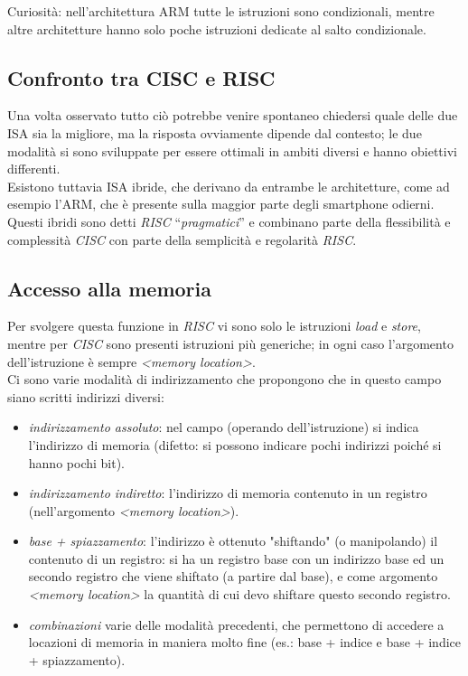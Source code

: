 \documentclass[class=book, crop=false, oneside]{standalone}
\begin{document}
Curiosità: nell'architettura ARM tutte le istruzioni sono condizionali, mentre altre architetture hanno solo poche istruzioni dedicate al salto condizionale.

\subsection{Confronto tra CISC e RISC}
Una volta osservato tutto ciò potrebbe venire spontaneo chiedersi quale delle due ISA sia la migliore, ma la risposta ovviamente dipende dal contesto; le due modalità si sono sviluppate per essere ottimali in ambiti diversi e hanno obiettivi differenti.\\
Esistono tuttavia ISA ibride, che derivano da entrambe le architetture, come ad esempio l’ARM, che è presente sulla maggior parte degli smartphone odierni. Questi ibridi sono detti \emph{RISC} “\emph{pragmatici}” e combinano parte della flessibilità e complessità  \emph{CISC} con parte della semplicità e regolarità \emph{RISC}.

\subsection{Accesso alla memoria}
Per svolgere questa funzione in \emph{RISC} vi sono solo le istruzioni \emph{load} e \emph{store}, mentre per \emph{CISC} sono presenti istruzioni più generiche; in ogni caso l’argomento dell’istruzione è sempre \emph{<memory location>}.\\
Ci sono varie modalità di indirizzamento che propongono che in questo campo siano scritti indirizzi diversi:
\begin{itemize}
	\item \emph{indirizzamento assoluto}: nel campo (operando dell’istruzione) si indica l’indirizzo di memoria (difetto: si possono indicare pochi indirizzi poiché si hanno pochi bit).
	\item \emph{indirizzamento indiretto}: l’indirizzo di memoria contenuto in un registro (nell’argomento \emph{<memory location>}).
	\item \emph{base + spiazzamento}: l’indirizzo è ottenuto "shiftando" (o manipolando) il contenuto di un registro: si ha un registro base con un indirizzo base ed un secondo registro che viene shiftato (a partire dal base), e come argomento \emph{<memory location>} la quantità di cui devo shiftare questo secondo registro.
	\item \emph{combinazioni} varie delle modalità precedenti, che permettono di accedere a locazioni di memoria in maniera molto fine (es.: base + indice e base + indice + spiazzamento).
\end{itemize}
\end{document}
